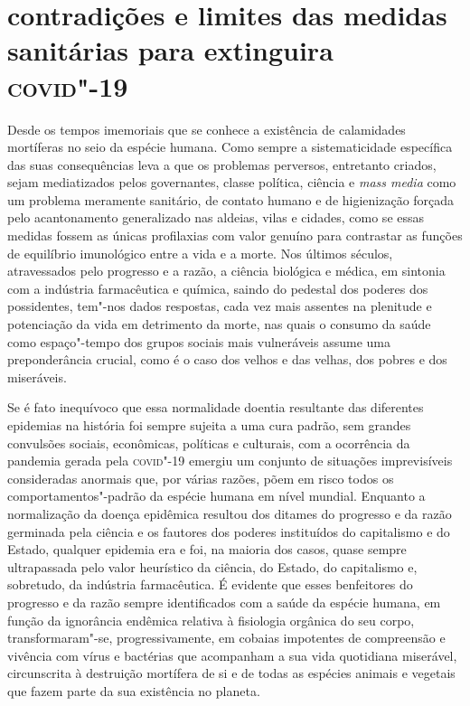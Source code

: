 
\section{contradições e limites das medidas sanitárias para extinguira
\textsc{covid}"-19}

Desde os tempos imemoriais que se conhece a existência de calamidades
mortíferas no seio da espécie humana. Como sempre a sistematicidade
específica das suas consequências leva a que os problemas perversos,
entretanto criados, sejam mediatizados pelos governantes, classe
política, ciência e \emph{mass media} como um problema meramente
sanitário, de contato humano e de higienização forçada pelo
acantonamento generalizado nas aldeias, vilas e cidades, como se essas
medidas fossem as únicas profilaxias com valor genuíno para contrastar
as funções de equilíbrio imunológico entre a vida e a morte. Nos últimos
séculos, atravessados pelo progresso e a razão, a ciência biológica e
médica, em sintonia com a indústria farmacêutica e química, saindo do
pedestal dos poderes dos possidentes, tem"-nos dados respostas, cada vez
mais assentes na plenitude e potenciação da vida em detrimento da morte,
nas quais o consumo da saúde como espaço"-tempo dos grupos sociais mais
vulneráveis assume uma preponderância crucial, como é o caso dos velhos
e das velhas, dos pobres e dos miseráveis.

Se é fato inequívoco que essa normalidade doentia resultante das
diferentes epidemias na história foi sempre sujeita a uma cura padrão,
sem grandes convulsões sociais, econômicas, políticas e culturais, com a
ocorrência da pandemia gerada pela \textsc{covid}"-19 emergiu um conjunto de
situações imprevisíveis consideradas anormais que, por várias razões,
põem em risco todos os comportamentos"-padrão da espécie humana em nível
mundial. Enquanto a normalização da doença epidêmica resultou dos
ditames do progresso e da razão germinada pela ciência e os fautores dos
poderes instituídos do capitalismo e do Estado, qualquer epidemia era e
foi, na maioria dos casos, quase sempre ultrapassada pelo valor
heurístico da ciência, do Estado, do capitalismo e, sobretudo, da
indústria farmacêutica. É evidente que esses benfeitores do progresso e
da razão sempre identificados com a saúde da espécie humana, em função
da ignorância endêmica relativa à fisiologia orgânica do seu corpo,
transformaram"-se, progressivamente, em cobaias impotentes de compreensão
e vivência com vírus e bactérias que acompanham a sua vida quotidiana
miserável, circunscrita à destruição mortífera de si e de todas as
espécies animais e vegetais que fazem parte da sua existência no
planeta.


